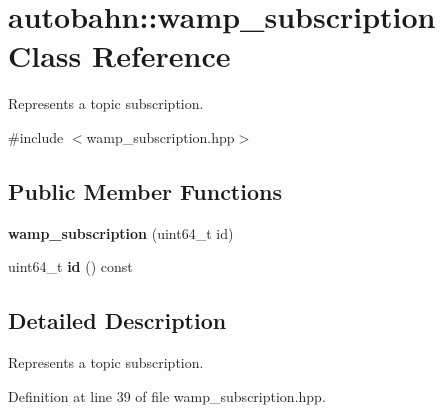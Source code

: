\hypertarget{classautobahn_1_1wamp__subscription}{}\section{autobahn\+:\+:wamp\+\_\+subscription Class Reference}
\label{classautobahn_1_1wamp__subscription}


Represents a topic subscription.  




{\ttfamily \#include $<$wamp\+\_\+subscription.\+hpp$>$}

\subsection*{Public Member Functions}
\begin{DoxyCompactItemize}
\item 
{\bfseries wamp\+\_\+subscription} (uint64\+\_\+t id)\hypertarget{classautobahn_1_1wamp__subscription_aec058b0aa842cf61187d987071dbbec1}{}\label{classautobahn_1_1wamp__subscription_aec058b0aa842cf61187d987071dbbec1}

\item 
uint64\+\_\+t {\bfseries id} () const \hypertarget{classautobahn_1_1wamp__subscription_ab75a6542d5b7005c4ac394ab91a048b4}{}\label{classautobahn_1_1wamp__subscription_ab75a6542d5b7005c4ac394ab91a048b4}

\end{DoxyCompactItemize}


\subsection{Detailed Description}
Represents a topic subscription. 

Definition at line 39 of file wamp\+\_\+subscription.\+hpp.

